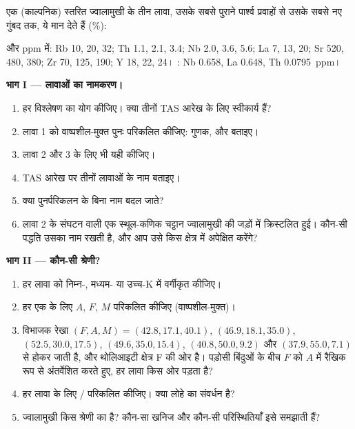 \begin{problem}[{सप्ताहांत समस्या --- तीन विश्लेषणों से एक ज्वालामुखी के परिवेश तक और
उन क्रिस्टलों तक जो वह पीछे छोड़ गया}]
\label{pb:b2:magmatic-series:1}
एक (काल्पनिक) स्तरित ज्वालामुखी के तीन लावा, उसके सबसे पुराने पार्श्व प्रवाहों से उसके सबसे नए
गुंबद तक, ये मान देते हैं (\unit{\percent}):

\smallskip{}

\smallskip\noindent और ppm में: Rb 10, 20, 32; Th 1.1, 2.1, 3.4; Nb 2.0, 3.6, 5.6;
La 7, 13, 20; Sr 520, 480, 380; Zr 70, 125, 190; Y 18, 22, 24। : Nb
0.658, La 0.648, Th \qty{0.0795}{ppm}।

\noindent\textbf{भाग I --- लावाओं का नामकरण।}
\begin{enumerate}
\item हर विश्लेषण का योग कीजिए। क्या तीनों TAS आरेख के लिए स्वीकार्य हैं?
\item लावा 1 को वाष्पशील-मुक्त पुनः परिकलित कीजिए: गुणक,  और
 बताइए।
\item लावा 2 और 3 के लिए भी यही कीजिए।
\item TAS आरेख पर तीनों लावाओं के नाम बताइए।
\item क्या पुनर्परिकलन के बिना नाम बदल जाते?
\item लावा 2 के संघटन वाली एक स्थूल-कणिक चट्टान ज्वालामुखी की
जड़ों में क्रिस्टलित हुई। कौन-सी पद्धति उसका नाम रखती है, और आप उसे किस क्षेत्र में अपेक्षित करेंगे?
\end{enumerate}

\noindent\textbf{भाग II --- कौन-सी श्रेणी?}
\begin{enumerate}[resume]
\item हर लावा को निम्न-, मध्यम- या उच्च-K में वर्गीकृत कीजिए।
\item हर एक के लिए $A$, $F$, $M$ परिकलित कीजिए (वाष्पशील-मुक्त)।
\item विभाजक रेखा $(F, A, M) = (42.8, 17.1, 40.1)$, $(46.9, 18.1,
35.0)$, $(52.5, 30.0, 17.5)$, $(49.6, 35.0, 15.4)$, $(40.8, 50.0, 9.2)$ और $(37.9,
55.0, 7.1)$ से होकर जाती है, और थोलिआइटी क्षेत्र F की ओर है। पड़ोसी बिंदुओं के बीच $F$ को
$A$ में रैखिक रूप से अंतर्वेशित करते हुए, हर लावा किस ओर पड़ता है?
\item हर लावा के लिए / परिकलित कीजिए। क्या लोहे का संवर्धन है?
\item ज्वालामुखी किस श्रेणी का है? कौन-सा खनिज और कौन-सी परिस्थितियाँ
इसे समझाती हैं?
\end{enumerate}


\end{problem}
